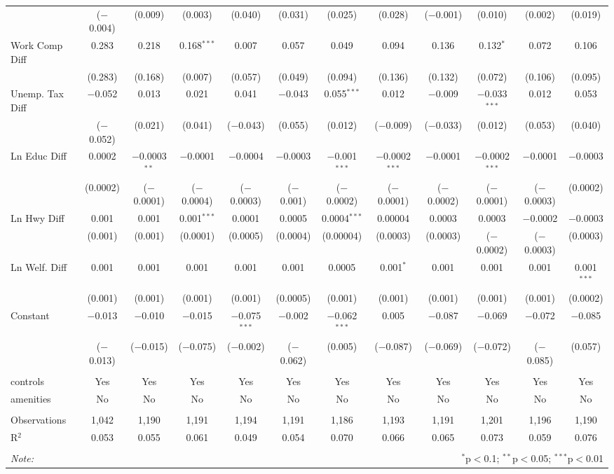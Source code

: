 \begin{table}[!htbp]
\begin{tabular}{@{\extracolsep{5pt}}lccccccccccc}
  & ($-$0.004) & (0.009) & (0.003) & (0.040) & (0.031) & (0.025) & (0.028) & ($-$0.001) & (0.010) & (0.002) & (0.019) \\ 
  Work Comp Diff & 0.283 & 0.218 & 0.168$^{***}$ & 0.007 & 0.057 & 0.049 & 0.094 & 0.136 & 0.132$^{*}$ & 0.072 & 0.106 \\ 
  & (0.283) & (0.168) & (0.007) & (0.057) & (0.049) & (0.094) & (0.136) & (0.132) & (0.072) & (0.106) & (0.095) \\ 
  Unemp. Tax Diff & $-$0.052 & 0.013 & 0.021 & 0.041 & $-$0.043 & 0.055$^{***}$ & 0.012 & $-$0.009 & $-$0.033$^{***}$ & 0.012 & 0.053 \\ 
  & ($-$0.052) & (0.021) & (0.041) & ($-$0.043) & (0.055) & (0.012) & ($-$0.009) & ($-$0.033) & (0.012) & (0.053) & (0.040) \\ 
  Ln Educ Diff & 0.0002 & $-$0.0003$^{**}$ & $-$0.0001 & $-$0.0004 & $-$0.0003 & $-$0.001$^{***}$ & $-$0.0002$^{***}$ & $-$0.0001 & $-$0.0002$^{***}$ & $-$0.0001 & $-$0.0003 \\ 
  & (0.0002) & ($-$0.0001) & ($-$0.0004) & ($-$0.0003) & ($-$0.001) & ($-$0.0002) & ($-$0.0001) & ($-$0.0002) & ($-$0.0001) & ($-$0.0003) & (0.0002) \\ 
  Ln Hwy Diff & 0.001 & 0.001 & 0.001$^{***}$ & 0.0001 & 0.0005 & 0.0004$^{***}$ & 0.00004 & 0.0003 & 0.0003 & $-$0.0002 & $-$0.0003 \\ 
  & (0.001) & (0.001) & (0.0001) & (0.0005) & (0.0004) & (0.00004) & (0.0003) & (0.0003) & ($-$0.0002) & ($-$0.0003) & (0.0003) \\ 
  Ln Welf. Diff & 0.001 & 0.001 & 0.001 & 0.001 & 0.001 & 0.0005 & 0.001$^{*}$ & 0.001 & 0.001 & 0.001 & 0.001$^{***}$ \\ 
  & (0.001) & (0.001) & (0.001) & (0.001) & (0.0005) & (0.001) & (0.001) & (0.001) & (0.001) & (0.001) & (0.0002) \\ 
  Constant & $-$0.013 & $-$0.010 & $-$0.015 & $-$0.075$^{***}$ & $-$0.002 & $-$0.062$^{***}$ & 0.005 & $-$0.087 & $-$0.069 & $-$0.072 & $-$0.085 \\ 
  & ($-$0.013) & ($-$0.015) & ($-$0.075) & ($-$0.002) & ($-$0.062) & (0.005) & ($-$0.087) & ($-$0.069) & ($-$0.072) & ($-$0.085) & (0.057) \\ 
 \hline \\[-1.8ex] 
controls & Yes & Yes & Yes & Yes & Yes & Yes & Yes & Yes & Yes & Yes & Yes \\ 
amenities & No & No & No & No & No & No & No & No & No & No & No \\ 
\hline \\[-1.8ex] 
Observations & 1,042 & 1,190 & 1,191 & 1,194 & 1,191 & 1,186 & 1,193 & 1,191 & 1,201 & 1,196 & 1,190 \\ 
R$^{2}$ & 0.053 & 0.055 & 0.061 & 0.049 & 0.054 & 0.070 & 0.066 & 0.065 & 0.073 & 0.059 & 0.076 \\ 
\hline 
\hline \\[-1.8ex] 
\textit{Note:}  & \multicolumn{11}{r}{$^{*}$p$<$0.1; $^{**}$p$<$0.05; $^{***}$p$<$0.01} \\ 
\end{tabular} 
\end{table} 
